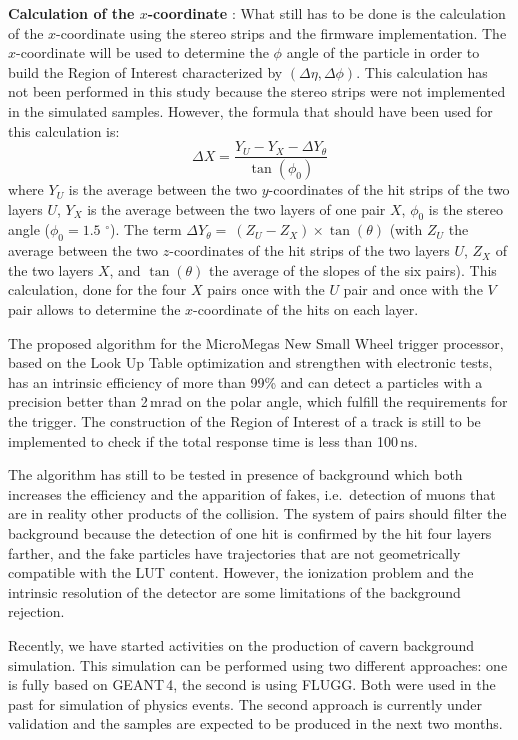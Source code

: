 \textbf{Calculation of the $x$-coordinate} : What still has to be done is the calculation of the $x$-coordinate using the stereo strips and the firmware implementation. The $x$-coordinate will be used to determine the $\phi$ angle of the particle in order to build the Region of Interest characterized by
 $(\Delta\eta,\Delta\phi)$. This calculation has not been performed in this study because the stereo strips were not implemented in the simulated
samples. However, the formula that should have been used for this calculation is:
 $$\Delta X= \frac{Y_{U}-Y_{X}-\Delta Y_{\theta}}{\tan(\phi_{0})}$$
 where $Y_{U}$ is the average between the two $y$-coordinates of the hit strips of the two layers $U$, $Y_{X}$ is the average between  the two layers of one pair $X$, $\phi_{0}$ is the stereo angle ($\phi_{0}=1.5$ $^{\circ}$). The term  $\Delta Y_{\theta}=~(Z_{U}-Z_{X})\times \tan(\theta)$ (with $Z_{U}$ the average between the two $z$-coordinates of the hit strips of the two layers $U$,  $Z_{X}$ of the two layers $X$, and $\tan(\theta)$ the average of the slopes of the six pairs). This calculation, done for the four $X$ pairs once with the $U$ pair and once with the $V$ pair allows to determine the $x$-coordinate of the hits on each layer.

The proposed algorithm for the MicroMegas New Small Wheel trigger processor, based on the Look Up Table optimization and strengthen with electronic tests, has an intrinsic efficiency of more than 99\% and can detect a particles with a precision better than 2\,mrad on the polar angle, which fulfill the requirements for the trigger. The construction of the Region of Interest of a track is still to be implemented to check if the total response time is less than 100\,ns.

The algorithm has still to be tested in presence of background which both increases the efficiency and the apparition of fakes, i.e.\ detection of muons that are in reality other products of the collision. The system of pairs should filter the background because the detection of one hit is confirmed by the hit four layers farther, and the fake particles have trajectories that are not geometrically compatible with the LUT content. However, the ionization problem and the intrinsic resolution of the detector are some limitations of the background rejection.

Recently, we have started activities on the production of cavern background simulation. This simulation can be performed using two different
approaches: one is fully based on GEANT\,4, the second is using FLUGG. Both were used in the past for simulation of physics events.
The second approach is currently under validation and the samples are expected to be produced in the next two months.
